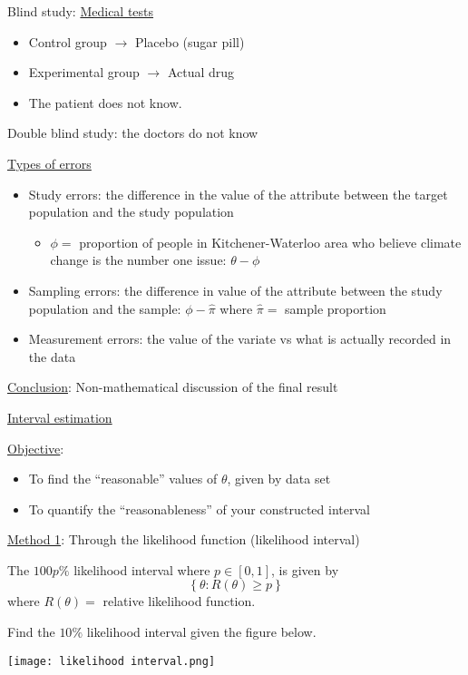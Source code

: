 Blind study: \underline{Medical tests}
\begin{itemize}
    \item Control group $ \rightarrow $ Placebo (sugar pill)
    \item Experimental group $ \rightarrow $ Actual drug
    \item The patient does not know.
\end{itemize}
Double blind study: the doctors do not know

\underline{Types of errors}
\begin{itemize}
    \item Study errors: the difference in the value of the attribute between
          the target population and the study population
          \begin{itemize}
              \item $ \phi= $ proportion of people in Kitchener-Waterloo area who
                    believe climate change is the number one issue: $ \theta-\phi $
          \end{itemize}
    \item Sampling errors: the difference in value of the attribute between the study
          population and the sample: $ \phi-\hat{\pi} $ where $ \hat{\pi}= $
          sample proportion
    \item Measurement errors: the value of the variate vs what is actually recorded
          in the data
\end{itemize}
\underline{Conclusion}: Non-mathematical discussion of the final result

\underline{Interval estimation}

\underline{Objective}:
\begin{itemize}
    \item To find the ``reasonable'' values of $ \theta $, given by data set
    \item To quantify the ``reasonableness'' of your constructed interval
\end{itemize}
\underline{Method 1}: Through the likelihood function (likelihood interval)

\begin{Definition}{}{}
    The $ 100p\% $ likelihood interval where $ p\in[0,1] $, is given by
    \[ \left\{ \theta:R(\theta)\geqslant p\right\} \]
    where $ R(\theta)= $ relative likelihood function.
\end{Definition}


\begin{Example}{}{}
    Find the $ 10\% $ likelihood interval given the figure below.
    \begin{center}
        \texttt{[image: likelihood interval.png]}
    \end{center}
\end{Example}

